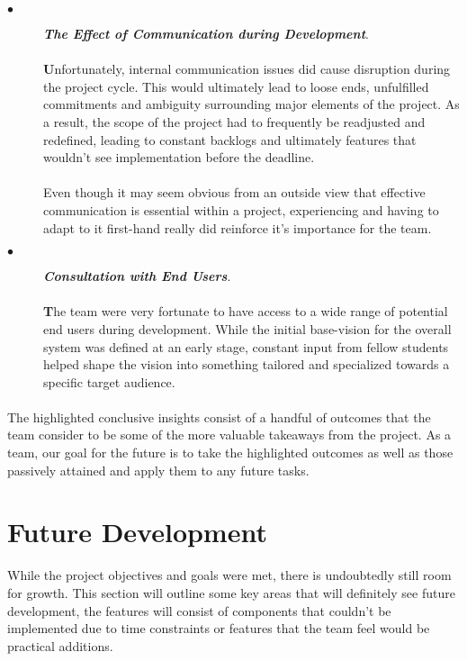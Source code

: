 \begin{description}
  \item[$\bullet$] \textit{\textbf{The Effect of Communication during Development}}.
  
  \paragraph{}
  \textbf{U}nfortunately, internal communication issues did cause disruption during the project cycle. This would ultimately lead to loose ends, unfulfilled commitments and ambiguity surrounding major elements of the project. As a result, the scope of the project had to frequently be readjusted and redefined, leading to constant backlogs and ultimately features that wouldn't see implementation before the deadline. 
  
  \paragraph{}
  Even though it may seem obvious from an outside view that effective communication is essential within a project, experiencing and having to adapt to it first-hand really did reinforce it's importance for the team. 
  
  \item[$\bullet$] \textit{\textbf{Consultation with End Users}}.
  
  \paragraph{}
  \textbf{T}he team were very fortunate to have access to a wide range of potential end users during development. While the initial base-vision for the overall system was defined at an early stage, constant input from fellow students helped shape the vision into something tailored and specialized towards a specific target audience.
\end{description}

\paragraph{}
The highlighted conclusive insights consist of a handful of outcomes that the team consider to be some of the more valuable takeaways from the project. As a team, our goal for the future is to take the highlighted outcomes as well as those passively attained and apply them to any future tasks.

\section{Future Development}
While the project objectives and goals were met, there is undoubtedly still room for growth. This section will outline some key areas that will definitely see future development, the features will consist of components that couldn't be implemented due to time constraints or features that the team feel would be practical additions.

